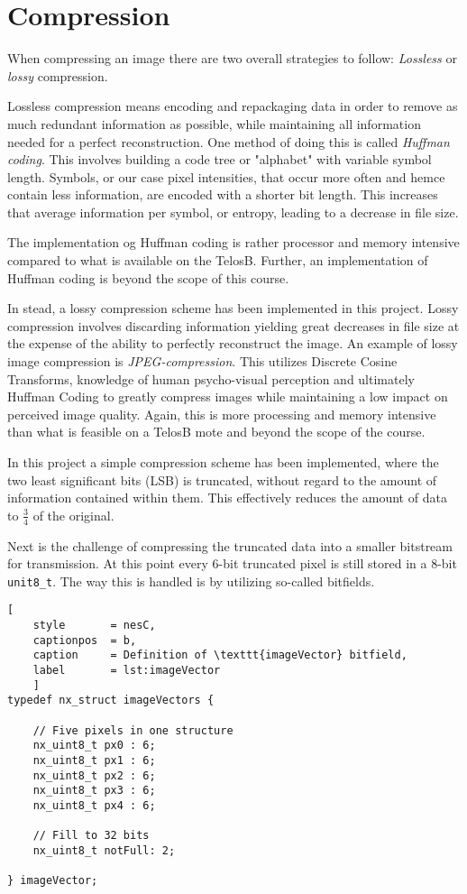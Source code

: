 \section{Compression}
When compressing an image there are two overall strategies to follow:
\emph{Lossless} or \emph{lossy} compression.

Lossless compression means encoding and repackaging data in order to remove as much redundant information as possible, while maintaining all information needed for a perfect reconstruction. 
One method of doing this is called \emph{Huffman coding}.
This involves building a code tree or "alphabet" with variable symbol length.
Symbols, or our case pixel intensities, that occur more often and hemce contain less information, are encoded with a shorter bit length. 
This increases that average information per symbol, or entropy, leading to a decrease in file size.

The implementation og Huffman coding is rather processor and memory intensive compared to what is available on the TelosB.
Further, an implementation of Huffman coding is beyond the scope of this course.

In stead, a lossy compression scheme has been implemented in this project.
Lossy compression involves discarding information yielding great decreases in file size at the expense of the ability to perfectly reconstruct the image.
An example of lossy image compression is \emph{JPEG-compression}.
This utilizes Discrete Cosine Transforms, knowledge of human psycho-visual perception and ultimately Huffman Coding to greatly compress images while maintaining a low impact on perceived image quality.
Again, this is more processing and memory intensive than what is feasible on a TelosB mote and beyond the scope of the course.

In this project a simple compression scheme has been implemented, where the two least significant  bits (LSB) is truncated, without regard to the amount of information contained within them.
This effectively reduces the amount of data to $ \frac{3}{4} $ of the original. 

Next is the challenge of compressing the truncated data into a smaller bitstream for transmission.
At this point every 6-bit truncated pixel is still stored in a 8-bit \texttt{unit8\_t}.
The way this is handled is by utilizing so-called bitfields.


\begin{lstlisting}[
	style		= nesC, 
	captionpos	= b, 
	caption		= Definition of \texttt{imageVector} bitfield,
	label		= lst:imageVector
	]
typedef nx_struct imageVectors {
	
	// Five pixels in one structure
	nx_uint8_t px0 : 6;
	nx_uint8_t px1 : 6;
	nx_uint8_t px2 : 6;
	nx_uint8_t px3 : 6;
	nx_uint8_t px4 : 6;
	
	// Fill to 32 bits
	nx_uint8_t notFull: 2;
	
} imageVector;

\end{lstlisting}


